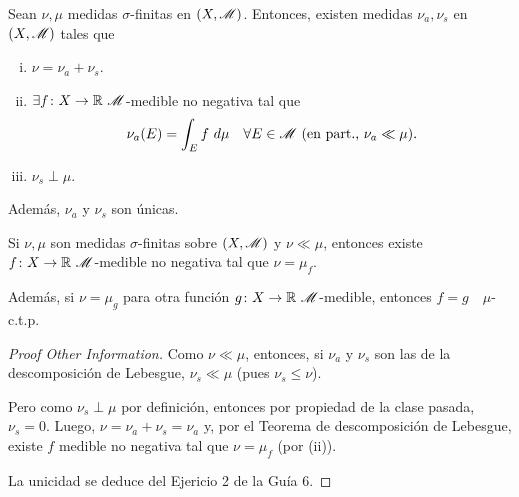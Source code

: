 \begin{theorem}
	Sean $\nu,\mu$ medidas $\sigma$-finitas en $(X, \mathscr{M})$. Entonces, existen medidas $\nu_{a}, \nu_{s}$ en $(X, \mathscr{M})$ tales que
	\begin{enumerate}[i)]
		\item $\nu = \nu_{a} + \nu_{s}$.

		\item $\exists f \colon X \to \R \ \mscr{M}$-medible no negativa tal que
		\[ \nu_{a}(E) = \int_{E} f \ d\mu \quad \forall E \in \mathscr{M} \ (\text{en part., } \nu_{a} \ll \mu). \]

		\item $\nu_{s} \perp \mu$.
	\end{enumerate}
	Además, $\nu_{a}$ y $\nu_{s}$ son únicas.
\end{theorem}

\begin{theorem}
	Si $\nu, \mu$ son medidas $\sigma$-finitas sobre $(X, \mathscr{M})$ y $\nu \ll \mu$, entonces existe $f \colon X \to \R \ \mscr{M}$-medible no negativa tal que $\nu = \mu_{f}$. \par
	Además, si $\nu = \mu_{g}$ para otra función $g \colon X \to \R \ \mscr{M}$-medible, entonces $f = g \quad \mu$-c.t.p.
\end{theorem}
\begin{proof}[Proof Other Information]
	Como $\nu \ll \mu$, entonces, si $\nu_{a}$ y $\nu_{s}$ son las de la descomposición de Lebesgue, $\nu_{s} \ll \mu$ (pues $\nu_{s} \leq \nu$). \par
	Pero como $\nu_{s} \perp \mu$ por definición, entonces por propiedad de la clase pasada, $\nu_{s} = 0$. Luego, $\nu = \nu_{a} + \nu_{s} = \nu_{a}$ y, por el Teorema de descomposición de Lebesgue, existe $f$ medible no negativa tal que $\nu = \mu_{f}$ (por (ii)). \par
	La unicidad se deduce del Ejericio 2 de la Guía 6.
\end{proof}
